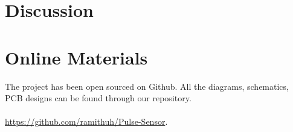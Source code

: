 \documentclass[12pt]{article}
\begin{document}
\newpage
\section{Discussion}
\lipsum[2]


\newpage
\section{Online Materials}
The project has been open sourced on Github. All the diagrams, schematics, PCB designs can be found through our repository.\\\\
\faGithub\href{https://github.com/ramithuh/Pulse-Sensor}{ https://github.com/ramithuh/Pulse-Sensor}.

 
\newpage


{}

\end{document}
